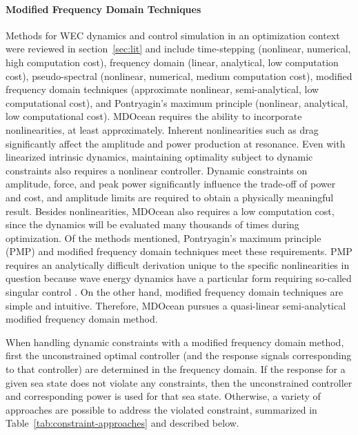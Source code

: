 \paragraph{Modified Frequency Domain Techniques}
Methods for WEC dynamics and control simulation in an optimization context were reviewed in section~\ref{sec:lit} and include time-stepping (nonlinear, numerical, high computation cost), frequency domain (linear, analytical, low computation cost), pseudo-spectral (nonlinear, numerical, medium computation cost), modified frequency domain techniques (approximate nonlinear, semi-analytical, low computational cost), and Pontryagin's maximum principle (nonlinear, analytical, low computational cost).
MDOcean requires the ability to incorporate nonlinearities, at least approximately.
Inherent nonlinearities such as drag significantly affect the amplitude and power production at resonance.
Even with linearized intrinsic dynamics, maintaining optimality subject to dynamic constraints also requires a nonlinear controller.
Dynamic constraints on amplitude, force, and peak power significantly influence the trade-off of power and cost, and amplitude limits are required to obtain a physically meaningful result.
Besides nonlinearities, MDOcean also requires a low computation cost, since the dynamics will be evaluated many thousands of times during optimization.
Of the methods mentioned, Pontryagin's maximum principle (PMP) and modified frequency domain techniques meet these requirements.
PMP requires an analytically difficult derivation unique to the specific nonlinearities in question because wave energy dynamics have a particular form requiring so-called singular control \cite{zou_optimal_2017}.
On the other hand, modified frequency domain techniques are simple and intuitive.
Therefore, MDOcean pursues a quasi-linear semi-analytical modified frequency domain method.

When handling dynamic constraints with a modified frequency domain method, first the unconstrained optimal controller (and the response signals corresponding to that controller) are determined in the frequency domain.
If the response for a given sea state does not violate any constraints, then the unconstrained controller and corresponding power is used for that sea state.
Otherwise, a variety of approaches are possible to address the violated constraint, summarized in Table~\ref{tab:constraint-approaches} and described below. 

